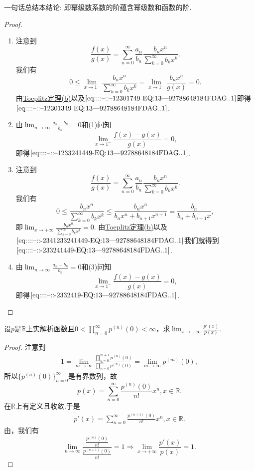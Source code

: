 \documentclass[../../main.tex]{subfiles}%
\begin{document}
\begin{remark}
一句话总结本结论: 即幂级数系数的阶蕴含幂级数和函数的阶.
\end{remark}
\begin{proof}
\begin{enumerate}[(1)]
\item 注意到
\[
\frac{f(x)}{g(x)} = \sum_{n=0}^{\infty} \frac{a_n}{b_n} \frac{b_n x^n}{\sum\limits_{k=0}^{\infty} b_k x^k}.
\]
我们有
\[
0 \leqslant \lim_{x \to 1^-} \frac{b_n x^n}{\sum\limits_{k=0}^{\infty} b_k x^k} = \lim_{x \to 1^-} \frac{b_n x^n}{g(x)} = 0.
\]
由\hyperref[theorem:Toeplitz定理]{Toeplitz定理(b)}以及\(\eqref{eq::::--::--12301749-EQ:13---92788648184FDAG..1}\)即得\(\eqref{eq::::--::--12301349-EQ:13---92788648184FDAG..1}\).

\item 由\(\lim_{n \to \infty} \frac{a_n - b_n}{b_n} = 0\)和(1)问知
\[
\lim_{x \to 1^-} \frac{f(x) - g(x)}{g(x)} = 0,
\]
即得\(\eqref{eq::::--::--1233241449-EQ:13---92788648184FDAG..1}\).

\item 注意到
\[
\frac{f(x)}{g(x)} = \sum_{n=0}^{\infty} \frac{a_n}{b_n} \frac{b_n x^n}{\sum\limits_{k=0}^{\infty} b_k x^k}.
\]
我们有
\[
0 \leqslant \frac{b_n x^n}{\sum\limits_{k=0}^{\infty} b_k x^k} \leqslant \frac{b_n x^n}{b_n x^n + b_{n+1} x^{n+1}} = \frac{b_n}{b_n + b_{n+1} x},
\]
即\(\lim_{x \to +\infty} \frac{b_n x^n}{\sum\limits_{k=0}^{\infty} b_k x^k} = 0\). 由\hyperref[theorem:Toeplitz定理]{Toeplitz定理(b)}以及\(\eqref{eq::::--::-2341233241449-EQ:13---92788648184FDAG..1}\)我们就得到\(\eqref{eq::::--::-233241449-EQ:13---92788648184FDAG..1}\).

\item 由\(\lim_{n \to \infty} \frac{a_n - b_n}{b_n} = 0\)和(3)问知
\[
\lim_{x \to 1^-} \frac{f(x) - g(x)}{g(x)} = 0,
\]
即得\(\eqref{eq::::--::-2332419-EQ:13---92788648184FDAG..1}\).
\end{enumerate}
\end{proof}

\begin{example}
设\(p\)是\(\mathbb{R}\)上实解析函数且\(0 < \prod_{n=0}^{\infty} p^{(n)}(0) < \infty\)，求\(\lim_{x \to +\infty} \frac{p'(x)}{p(x)}\).
\end{example}
\begin{proof}
注意到
\begin{align*}
1=\underset{m\rightarrow \infty}{\lim}\frac{\prod\limits_{n=0}^{m+1}{p^{\left( n \right)}\left( 0 \right)}}{\prod\limits_{n=0}^m{p^{\left( n \right)}\left( 0 \right)}}=\lim_{m\rightarrow \infty} p^{\left( m \right)}\left( 0 \right),
\end{align*}
所以\(\{p^{(n)}(0)\}_{n=0}^{\infty}\)是有界数列，故
\[
p(x)=\sum_{n=0}^{\infty}{\frac{p^{(n)}(0)}{n!}x^n,}x\in \mathbb{R} .
\]
在$\mathbb{R}$上有定义且收敛.于是
\begin{align*}
p'(x)=\sum_{n=0}^{\infty}{\frac{p^{(n+1)}(0)}{n!}x^n,}x\in \mathbb{R} .
\end{align*}
由，我们有
\[
\lim_{n \to \infty} \frac{\frac{p^{(n)}(0)}{n!}}{\frac{p^{(n+1)}(0)}{n!}} = 1 \Rightarrow \lim_{x \to +\infty} \frac{p'(x)}{p(x)} = 1.
\]
\end{proof}
\end{document}

